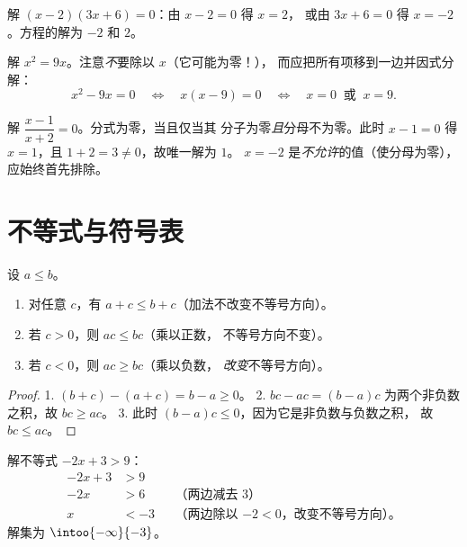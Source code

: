 \begin{example}\label{ex:g10:algebra:zeroproduct}
解 $(x - 2)(3x + 6) = 0$：由 $x - 2 = 0$ 得 $x = 2$，
或由 $3x + 6 = 0$ 得 $x = -2$。方程的解为 $-2$ 和 $2$。

解 $x^2 = 9x$。注意\emph{不}要除以 $x$（它可能为零！），
而应把所有项移到一边并因式分解：
\[
x^2 - 9x = 0
\quad\Longleftrightarrow\quad
x(x - 9) = 0
\quad\Longleftrightarrow\quad
x = 0 \ \text{ 或 } \ x = 9 .
\]
\end{example}

\begin{example}[分式方程]\label{ex:g10:algebra:quotient}
解 $\dfrac{x - 1}{x + 2} = 0$。分式为零，当且仅当其
分子为零\emph{且}分母不为零。此时 $x - 1 = 0$
得 $x = 1$，且 $1 + 2 = 3 \neq 0$，故唯一解为 $1$。
$x = -2$ 是\emph{不允许}的值（使分母为零），
应始终首先排除。
\end{example}

\section{不等式与符号表}

\begin{proposition}[不等式的性质]\label{prop:g10:algebra:ineqrules}
设 $a \leq b$。
\begin{enumerate}
  \item 对任意 $c$，有 $a + c \leq b + c$（加法不改变不等号方向）。
  \item 若 $c > 0$，则 $ac \leq bc$（乘以正数，
        不等号方向不变）。
  \item 若 $c < 0$，则 $ac \geq bc$（乘以负数，
        \emph{改变}不等号方向）。
\end{enumerate}
\end{proposition}

\begin{proof}
1. $(b + c) - (a + c) = b - a \geq 0$。
2. $bc - ac = (b-a)c$ 为两个非负数之积，故
$bc \geq ac$。
3. 此时 $(b-a)c \leq 0$，因为它是非负数与负数之积，
故 $bc \leq ac$。
\end{proof}

\begin{example}\label{ex:g10:algebra:firstineq}
解不等式 $-2x + 3 > 9$：
\begin{align*}
-2x + 3 &> 9 \\
-2x &> 6 && \text{（两边减去 3）} \\
x &< -3 && \text{（两边除以 $-2 < 0$，改变不等号方向）。}
\end{align*}
解集为 $\intoo{-\infty}{-3}$。
\end{example}

